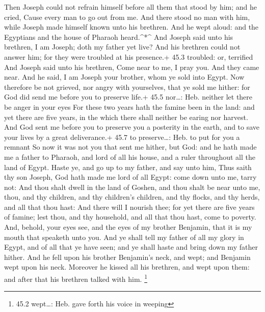  Then Joseph could not refrain himself before all them that
stood by him; and he cried, Cause every man to go out from me. And there
stood no man with him, while Joseph made himself known unto his
brethren.  And he wept aloud: and the Egyptians and the
house of Pharaoh heard.\^{}*\^{}  And Joseph said unto his
brethren, I am Joseph; doth my father yet live? And his brethren could
not answer him; for they were troubled at his presence.+ 45.3 troubled:
or, terrified  And Joseph said unto his brethren, Come near
to me, I pray you. And they came near. And he said, I am Joseph your
brother, whom ye sold into Egypt.  Now therefore be not
grieved, nor angry with yourselves, that ye sold me hither: for God did
send me before you to preserve life.+ 45.5 nor\ldots: Heb. neither let
there be anger in your eyes  For these two years hath the
famine been in the land: and yet there are five years, in the which
there shall neither be earing nor harvest.  And God sent me
before you to preserve you a posterity in the earth, and to save your
lives by a great deliverance.+ 45.7 to preserve\ldots: Heb. to put for
you a remnant  So now it was not you that sent me hither,
but God: and he hath made me a father to Pharaoh, and lord of all his
house, and a ruler throughout all the land of Egypt.  Haste
ye, and go up to my father, and say unto him, Thus saith thy son Joseph,
God hath made me lord of all Egypt: come down unto me, tarry not:
 And thou shalt dwell in the land of Goshen, and thou shalt
be near unto me, thou, and thy children, and thy children's children,
and thy flocks, and thy herds, and all that thou hast:  And
there will I nourish thee; for yet there are five years of famine; lest
thou, and thy household, and all that thou hast, come to poverty.
 And, behold, your eyes see, and the eyes of my brother
Benjamin, that it is my mouth that speaketh unto you.  And
ye shall tell my father of all my glory in Egypt, and of all that ye
have seen; and ye shall haste and bring down my father hither.
 And he fell upon his brother Benjamin's neck, and wept;
and Benjamin wept upon his neck.  Moreover he kissed all
his brethren, and wept upon them: and after that his brethren talked
with him. \footnote{45.2 wept\ldots: Heb. gave forth his voice in
  weeping}

